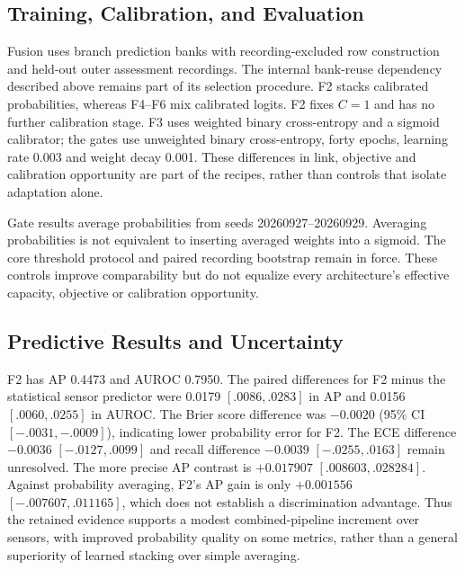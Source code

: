 \subsection{Training, Calibration, and Evaluation}
Fusion uses branch prediction banks with recording-excluded row construction and
held-out outer assessment recordings. The internal bank-reuse dependency described above
remains part of its selection procedure. F2 stacks calibrated probabilities, whereas
F4--F6 mix calibrated logits. F2 fixes $C=1$ and has no further calibration stage. F3
uses weighted binary cross-entropy and a sigmoid calibrator; the gates use unweighted
binary cross-entropy, forty epochs, learning rate 0.003 and weight decay 0.001. These
differences in link, objective and calibration opportunity are part of the recipes,
rather than controls that isolate adaptation alone.

Gate results average probabilities from seeds 20260927--20260929. Averaging
probabilities is not equivalent to inserting averaged weights into a sigmoid. The core
threshold protocol and paired recording bootstrap remain in force. These controls
improve comparability but do not equalize every architecture's effective capacity,
objective or calibration opportunity.

\subsection{Predictive Results and Uncertainty}
F2 has AP 0.4473 and AUROC 0.7950. The paired differences for F2 minus the statistical
sensor predictor were 0.0179 $[.0086,.0283]$ in AP and 0.0156 $[.0060,.0255]$ in AUROC.
The Brier score difference was $-0.0020$ (95\% CI $[-.0031,-.0009]$), indicating lower
probability error for F2. The ECE difference $-0.0036$ $[-.0127,.0099]$ and recall
difference $-0.0039$ $[-.0255,.0163]$ remain unresolved. The more precise AP contrast is
$+0.017907$ $[.008603,.028284]$. Against probability averaging, F2's AP gain is only
$+0.001556$ $[-.007607,.011165]$, which does not establish a discrimination advantage.
Thus the retained evidence supports a modest combined-pipeline increment over sensors,
with improved probability quality on some metrics, rather than a general superiority of
learned stacking over simple averaging.

